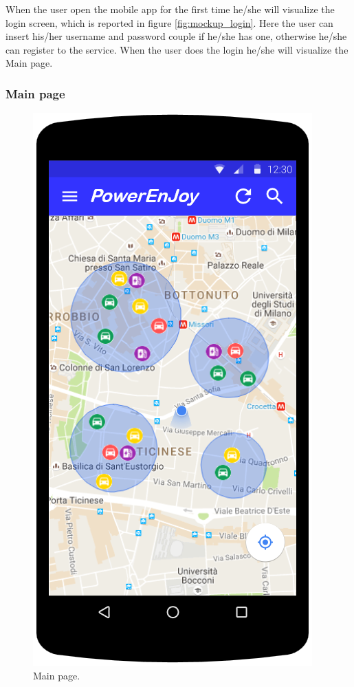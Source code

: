 When the user open the mobile app for the first time he/she will visualize the login screen, which is reported in figure \ref{fig:mockup_login}. Here the user can insert his/her username and password couple if he/she has one, otherwise he/she can register to the service. When the user does the login he/she will visualize the Main page.

\subsubsection*{Main page}

\begin{figure}
	\centering
	\includegraphics[width=\textwidth,height=\dimexpr\textheight-4\baselineskip-\abovecaptionskip-\belowcaptionskip\relax,keepaspectratio]{overall_description/mockup/main_page.png}
	\caption{Main page.}
	\label{fig:mockup_main_page}
\end{figure}

